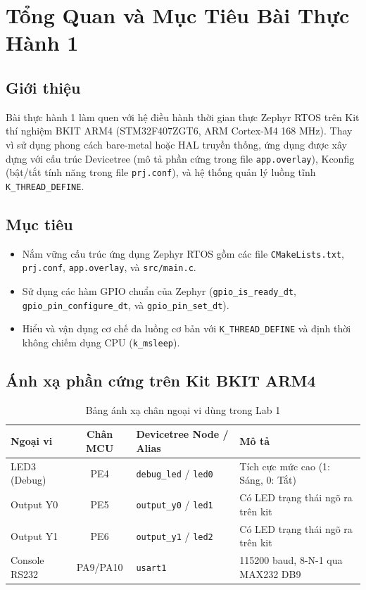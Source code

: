 \section{Tổng Quan và Mục Tiêu Bài Thực Hành 1}

\subsection{Giới thiệu}
Bài thực hành 1 làm quen với hệ điều hành thời gian thực Zephyr RTOS trên Kit thí nghiệm BKIT ARM4 (STM32F407ZGT6, ARM Cortex-M4 168 MHz). Thay vì sử dụng phong cách bare-metal hoặc HAL truyền thống, ứng dụng được xây dựng với cấu trúc Devicetree (mô tả phần cứng trong file \texttt{app.overlay}), Kconfig (bật/tắt tính năng trong file \texttt{prj.conf}), và hệ thống quản lý luồng tĩnh \texttt{K\_THREAD\_DEFINE}.

\subsection{Mục tiêu}
\begin{itemize}
    \item Nắm vững cấu trúc ứng dụng Zephyr RTOS gồm các file \texttt{CMakeLists.txt}, \texttt{prj.conf}, \texttt{app.overlay}, và \texttt{src/main.c}.
    \item Sử dụng các hàm GPIO chuẩn của Zephyr (\texttt{gpio\_is\_ready\_dt}, \texttt{gpio\_pin\_configure\_dt}, và \texttt{gpio\_pin\_set\_dt}).
    \item Hiểu và vận dụng cơ chế đa luồng cơ bản với \texttt{K\_THREAD\_DEFINE} và định thời không chiếm dụng CPU (\texttt{k\_msleep}).
\end{itemize}

\subsection{Ánh xạ phần cứng trên Kit BKIT ARM4}
\begin{table}[h!]
\centering
\caption{Bảng ánh xạ chân ngoại vi dùng trong Lab 1}
\label{tab:hardware_lab1}
\begin{tabularx}{\textwidth}{|l|c|X|X|}
\hline
\textbf{Ngoại vi} & \textbf{Chân MCU} & \textbf{Devicetree Node / Alias} & \textbf{Mô tả} \\
\hline
LED3 (Debug) & PE4 & \texttt{debug\_led} / \texttt{led0} & Tích cực mức cao (1: Sáng, 0: Tắt) \\
Output Y0 & PE5 & \texttt{output\_y0} / \texttt{led1} & Có LED trạng thái ngõ ra trên kit \\
Output Y1 & PE6 & \texttt{output\_y1} / \texttt{led2} & Có LED trạng thái ngõ ra trên kit \\
Console RS232 & PA9/PA10 & \texttt{usart1} & 115200 baud, 8-N-1 qua MAX232 DB9 \\
\hline
\end{tabularx}
\end{table}

